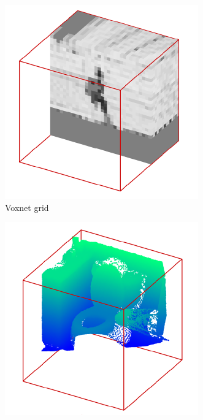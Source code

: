 \begin{figure}[!b]
\begin{subfigure}{0.23\textwidth}
		\includegraphics[width=\linewidth]{Figures/ObjRecog/voxnet_4}
		\caption{Voxnet grid}
		\label{subfig:objrecog:voxnet:lidar_grid}
	\end{subfigure}
	\hfill
	\begin{subfigure}{0.23\textwidth}
		\centering
		\includegraphics[width=\linewidth]{Figures/ObjRecog/voxnet_2}

\end{subfigure}
\end{figure}
